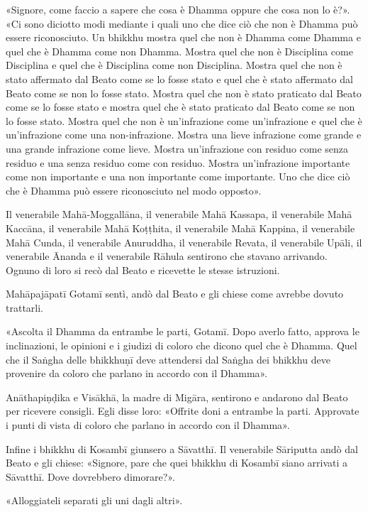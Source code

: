 «Signore, come faccio a sapere che cosa è Dhamma oppure che cosa non lo è?». «Ci
sono diciotto modi mediante i quali uno che dice ciò che non è Dhamma può essere
riconosciuto. Un bhikkhu mostra quel che non è Dhamma come Dhamma e quel che è
Dhamma come non Dhamma. Mostra quel che non è Disciplina come Disciplina e quel
che è Disciplina come non Disciplina. Mostra quel che non è stato affermato dal
Beato come se lo fosse stato e quel che è stato affermato dal Beato come se non
lo fosse stato. Mostra quel che non è stato praticato dal Beato come se lo fosse
stato e mostra quel che è stato praticato dal Beato come se non lo fosse stato.
Mostra quel che non è un’infrazione come un’infrazione e quel che è
un’infrazione come una non-infrazione. Mostra una lieve infrazione come grande e
una grande infrazione come lieve. Mostra un’infrazione con residuo come senza
residuo e una senza residuo come con residuo. Mostra un’infrazione importante
come non importante e una non importante come importante. Uno che dice ciò che è
Dhamma può essere riconosciuto nel modo opposto».

Il venerabile Mahā-Moggallāna, il venerabile Mahā Kassapa, il venerabile Mahā
Kaccāna, il venerabile Mahā Koṭṭhita, il venerabile Mahā Kappina, il venerabile
Mahā Cunda, il venerabile Anuruddha, il venerabile Revata, il venerabile Upāli,
il venerabile Ānanda e il venerabile Rāhula sentirono che stavano arrivando.
Ognuno di loro si recò dal Beato e ricevette le stesse istruzioni.

Mahāpajāpatī Gotamī sentì, andò dal Beato e gli chiese come avrebbe dovuto
trattarli.

«Ascolta il Dhamma da entrambe le parti, Gotamī. Dopo averlo fatto, approva le
inclinazioni, le opinioni e i giudizi di coloro che dicono quel che è Dhamma.
Quel che il Saṅgha delle bhikkhuṇī deve attendersi dal Saṅgha dei bhikkhu deve
provenire da coloro che parlano in accordo con il Dhamma».

Anāthapiṇḍika e Visākhā, la madre di Migāra, sentirono e andarono dal Beato per
ricevere consigli. Egli disse loro: «Offrite doni a entrambe la parti. Approvate
i punti di vista di coloro che parlano in accordo con il Dhamma».

Infine i bhikkhu di Kosambī giunsero a Sāvatthī. Il venerabile Sāriputta andò
dal Beato e gli chiese: «Signore, pare che quei bhikkhu di Kosambī siano
arrivati a Sāvatthī. Dove dovrebbero dimorare?».

«Alloggiateli separati gli uni dagli altri».

